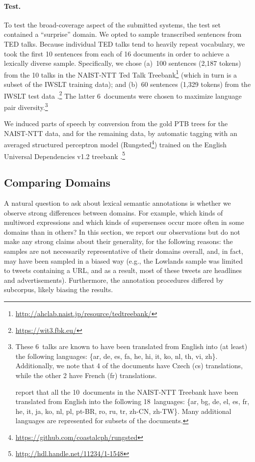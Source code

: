 \documentclass[11pt,letterpaper]{article}
\begin{document}
\paragraph{Test.}
To test the broad-coverage aspect of the submitted systems, the test set contained a ``surprise'' domain. 
We opted to sample transcribed sentences from TED talks. 
Because individual TED talks tend to heavily repeat vocabulary, we took the first 10 sentences 
from each of 16 documents in order to achieve a lexically diverse sample. 
Specifically, we chose 
(a)~100 sentences (2,187 tokens) from the 10 talks in the 
NAIST-NTT Ted Talk Treebank\footnote{\url{http://ahclab.naist.jp/resource/tedtreebank/}} \citep{neubig-2014naist} 
(which in turn is a subset of the IWSLT training data); 
and (b)~60 sentences (1,329 tokens) from the IWSLT test data \citep{cettolo-2012wit3}.\footnote{\url{https://wit3.fbk.eu/}}
The latter 6~documents were chosen to maximize language pair diversity.\footnote{These 6~talks
are known to have been translated from English into (at least) the following languages: 
\{ar, de, es, fa, he, hi, it, ko, nl, th, vi, zh\}. Additionally, we note that 4 of the documents have Czech (cs) 
translations, while the other 2 have French (fr) translations.

report that all the 10~documents in the NAIST-NTT Treebank have been translated from English into the following 
18~languages: \{ar, bg, de, el, es, fr, he, it, ja, ko, nl, pl, \mbox{pt-BR}, ro, ru, tr, \mbox{zh-CN}, \mbox{zh-TW}\}. 
Many additional languages are represented for subsets of the documents.}

We induced parts of speech by conversion from the gold PTB trees for the NAIST-NTT data, 
and for the remaining data, by automatic tagging with an averaged structured perceptron model (Rungsted\footnote{\url{https://github.com/coastalcph/rungsted}}) 
trained on the English Universal Dependencies v1.2 treebank \citep{nivre-15}.\footnote{\url{http://hdl.handle.net/11234/1-1548}}

\subsection{Comparing Domains}

A natural question to ask about lexical semantic annotations is whether we observe strong differences between domains.
For example, which kinds of multiword expressions and which kinds of supersenses 
occur more often in some domains than in others?
In this section, we report our observations but do not make any strong claims about their generality, for the following reasons:
 the samples are not necessarily representative of their domains overall, 
and, in fact, may have been sampled in a biased way (e.g., the Lowlands sample was limited to tweets containing a URL, 
and as a result, most of these tweets are headlines and advertisements).
Furthermore, the annotation procedures differed by subcorpus, likely biasing the results.
\end{document}

